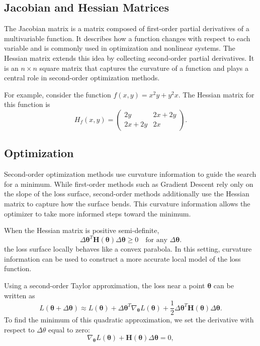 \documentclass{article}
\newcommand{\vecb}[1]{\boldsymbol{#1}} %
\newcommand{\matb}[1]{\mathbf{#1}}     %
\begin{document}
\subsection{Jacobian and Hessian Matrices}

The Jacobian matrix is a matrix composed of first-order partial derivatives of a multivariable function. It describes how a function changes with respect to each variable and is commonly used in optimization and nonlinear systems. The Hessian matrix extends this idea by collecting second-order partial derivatives. It is an \( n \times n \) square matrix that captures the curvature of a function and plays a central role in second-order optimization methods.

For example, consider the function \( f(x,y) = x^2y + y^2x \). The Hessian matrix for this function is
\[
H_f(x,y)=
\begin{pmatrix}
2y & 2x+2y\\
2x+2y & 2x
\end{pmatrix}.
\]

\subsection{Optimization}

Second-order optimization methods use curvature information to guide the search for a minimum. While first-order methods such as Gradient Descent rely only on the slope of the loss surface, second-order methods additionally use the Hessian matrix to capture how the surface bends. This curvature information allows the optimizer to take more informed steps toward the minimum.

When the Hessian matrix is positive semi-definite,
\[
\Delta\vecb{\theta}^T \matb{H}(\vecb{\theta})\Delta\vecb{\theta} \ge 0
\quad \text{for any } \Delta\vecb{\theta}.
\]
the loss surface locally behaves like a convex parabola. In this setting, curvature information can be used to construct a more accurate local model of the loss function.

Using a second-order Taylor approximation, the loss near a point \( \vecb{\theta} \) can be written as
\[
L(\vecb{\theta}+\Delta\vecb{\theta})
\approx
L(\vecb{\theta})
+\Delta\vecb{\theta}^T\nabla_{\vecb{\theta}} L(\vecb{\theta})
+\frac{1}{2}\Delta\vecb{\theta}^T \matb{H}(\vecb{\theta})\Delta\vecb{\theta}.
\]
To find the minimum of this quadratic approximation, we set the derivative with respect to \( \Delta\theta \) equal to zero:
\[
\nabla_{\vecb{\theta}} L(\vecb{\theta})
+\matb{H}(\vecb{\theta})\Delta\vecb{\theta}=0,
\]
\end{document}
